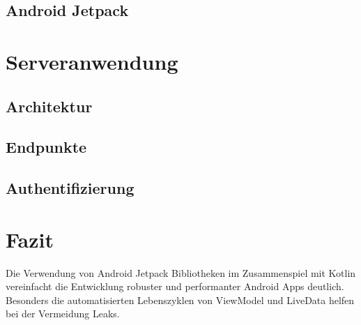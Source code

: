 \documentclass[a4paper, 11pt]{article}
\begin{document}
\subsection{Android Jetpack}
\label{subsec:app:jetpack}

\section{Serveranwendung}
\label{sec:backend}

\subsection{Architektur}
\label{subsec:backend:architecture}

\subsection{Endpunkte}
\label{subsec:backend:endpoints}

\subsection{Authentifizierung}
\label{subsec:backend:authentication}

\section{Fazit}
\label{sec:conclusion}

Die Verwendung von Android Jetpack Bibliotheken im Zusammenspiel mit Kotlin vereinfacht die Entwicklung robuster und performanter Android Apps deutlich.
Besonders die automatisierten Lebenszyklen von ViewModel und LiveData helfen bei der Vermeidung Leaks.
\end{document}
